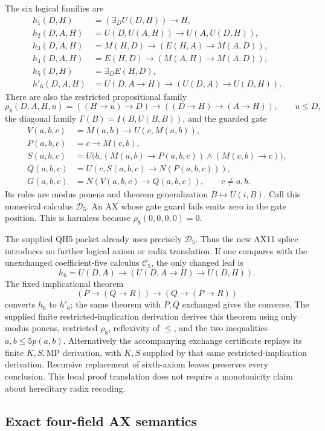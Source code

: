 The six logical families are
\begin{align*}
 h_1(D,H)&=(\exists_D U(D,H))\to H,\\
 h_2(D,A,H)&=U(D,U(A,H))\to U(A,U(D,H)),\\
 h_3(D,A,H)&=M(H,D)\to(E(H,A)\to M(A,D)),\\
 h_4(D,A,H)&=E(H,D)\to(M(A,H)\to M(A,D)),\\
 h_5(D,H)&=\exists_D E(H,D),\\
 h'_6(D,A,H)&=U(D,A\to H)\to(U(D,A)\to U(D,H)).
\end{align*}
There are also the restricted propositional family
\[
 \rho_8(D,A,H,u)=((H\to u)\to D)\to((D\to H)\to(A\to H)),
 \qquad u\leq D,
\]
the diagonal family $\Gamma(B)=I(B,U(B,B))$, and the guarded gate
\begin{align*}
 V(a,b,c)&=M(a,b)\to U(c,M(a,b)),\\
 P(a,b,c)&=c\to M(c,b),\\
 S(a,b,c)&=U\bigl(b,(M(a,b)\to P(a,b,c))
                         \wedge(M(c,b)\to c)\bigr),\\
 Q(a,b,c)&=U(c,S(a,b,c)\to N(P(a,b,c))),\\
 G(a,b,c)&=N(V(a,b,c)\to Q(a,b,c)),\qquad c\ne a,b.
\end{align*}
Its rules are modus ponens and theorem generalization
$B\mapsto U(i,B)$.  Call this numerical calculus $\mathcal D_5$.
An AX whose gate guard fails emits zero in the gate position.
This is harmless because $\rho_8(0,0,0,0)=0$.

The supplied QH5 packet already uses precisely $\mathcal D_5$.
Thus the new AX11 splice introduces no further logical axiom or radix
translation.  If one compares with the unexchanged coefficient-five
calculus $\mathcal C_5$, the only changed leaf is
\[
 h_6=U(D,A)\to(U(D,A\to H)\to U(D,H)).
\]
The fixed implicational theorem
\[
 (P\to(Q\to R))\to(Q\to(P\to R))
\]
converts $h_6$ to $h'_6$; the same theorem with $P,Q$ exchanged gives
the converse.  The supplied finite restricted-implication derivation
derives this theorem using only modus ponens, restricted $\rho_8$,
reflexivity of $\leq$, and the two inequalities
$a,b\leq 5p(a,b)$.  Alternatively the accompanying exchange certificate
replays its finite $K,S,\mathrm{MP}$ derivation, with $K,S$ supplied by
that same restricted-implication derivation.  Recursive replacement of
sixth-axiom leaves preserves every conclusion.  This local proof
translation does not require a monotonicity claim about hereditary radix
recoding.

\subsection{Exact four-field AX semantics}

